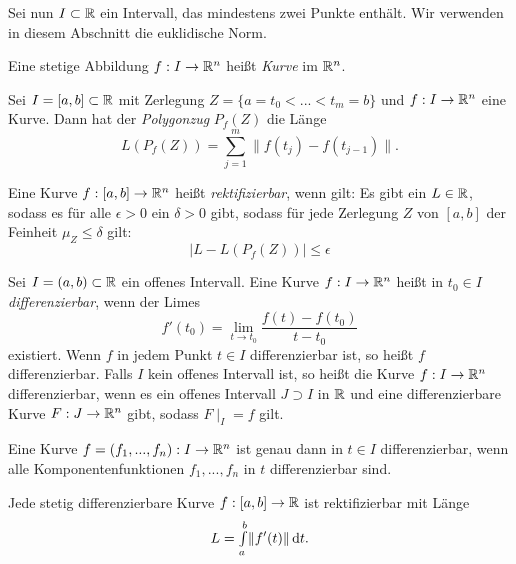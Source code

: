 \documentclass{cheat-sheet}
\begin{document}
\begin{nota}
Sei nun $I \subset \mathbb{R}$ ein Intervall, das mindestens zwei Punkte enthält. Wir verwenden in diesem Abschnitt die euklidische Norm.
\end{nota}

\begin{defn}
Eine stetige Abbildung $f : I \to \mathbb{R}^n$ heißt \emph{Kurve} im $\mathbb{R}^n$.\\
\end{defn}

\begin{defn}
Sei $I = [a, b] \subset \mathbb{R}$ mit Zerlegung $Z = \{ a = t_0 < ... < t_m = b \}$ und $f : I \to \mathbb{R}^n$ eine Kurve. Dann hat der \emph{Polygonzug} $P_f(Z)$ die Länge
\[ L(P_f(Z)) = \sum_{j = 1}^{m} \| f(t_j) - f(t_{j-1}) \|. \]
\end{defn}

\begin{defn}
Eine Kurve $f : [a, b] \to \mathbb{R}^n$ heißt \emph{rektifizierbar}, wenn gilt: Es gibt ein $L \in \mathbb{R}$, sodass es für alle $\epsilon > 0$ ein $\delta > 0$ gibt, sodass für jede Zerlegung $Z$ von $[a, b]$ der Feinheit $\mu_Z \le \delta$ gilt:
\[ |L - L(P_f(Z))| \le \epsilon \]
\end{defn}


\begin{defn}
Sei $I = (a, b) \subset \mathbb{R}$ ein offenes Intervall. Eine Kurve $f : I \to \mathbb{R}^n$ heißt in $t_0 \in I$ \emph{differenzierbar}, wenn der Limes
\[ f'(t_0) = \lim_{t \to t_0} \frac{f(t) - f(t_0)}{t - t_0} \]
existiert. Wenn $f$ in jedem Punkt $t \in I$ differenzierbar ist, so heißt $f$ differenzierbar.
Falls $I$ kein offenes Intervall ist, so heißt die Kurve $f : I \to \mathbb{R}^n$ differenzierbar, wenn es ein offenes Intervall $J \supset I$ in $\mathbb{R}$ und eine differenzierbare Kurve $F : J \to \mathbb{R}^n$ gibt, sodass $F\mid_{I} = f$ gilt.
\end{defn}

\begin{bem}
Eine Kurve $f = (f_1, ..., f_n) : I \to \mathbb{R}^n$ ist genau dann in $t \in I$ differenzierbar, wenn alle Komponentenfunktionen $f_1, ..., f_n$ in $t$ differenzierbar sind.
\end{bem}

\begin{satz}
Jede stetig differenzierbare Kurve $f : [a, b] \to \mathbb{R}$ ist rektifizierbar mit Länge
\[ L = {\textstyle \int\limits_{a}^{b}} \| f'(t) \| \,\mathrm{d} t. \]
\end{satz}
\end{document}
